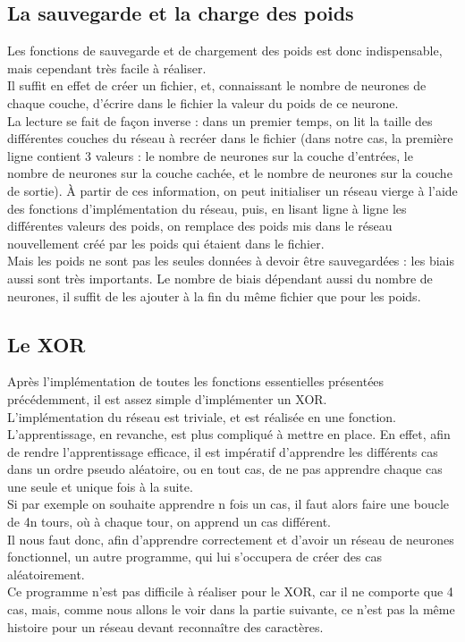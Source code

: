 \documentclass[14pt]{article}
\begin{document}
\subsection{La sauvegarde et la charge des poids}
Les fonctions de sauvegarde et de chargement des poids est donc indispensable, mais cependant très facile à réaliser.\\
Il suffit en effet de créer un fichier, et, connaissant le nombre de neurones de chaque couche, d'écrire dans le fichier la valeur du poids de ce neurone.\\
La lecture se fait de façon inverse : dans un premier temps, on lit la taille des différentes couches du réseau à recréer dans le fichier (dans notre cas, la première ligne contient 3 valeurs : le nombre de neurones sur la couche d'entrées, le nombre de neurones sur la couche cachée, et le nombre de neurones sur la couche de sortie). À partir de ces information, on peut initialiser un réseau vierge à l'aide des fonctions d'implémentation du réseau, puis, en lisant ligne à ligne les différentes valeurs des poids, on remplace des poids mis dans le réseau nouvellement créé par les poids qui étaient dans le fichier.\\
Mais les poids ne sont pas les seules données à devoir être sauvegardées : les biais aussi sont très importants. Le nombre de biais dépendant aussi du nombre de neurones, il suffit de les ajouter à la fin du même fichier que pour les poids.\\
\newpage
\subsection{Le XOR}
Après l'implémentation de toutes les fonctions essentielles présentées précédemment, il est assez simple d'implémenter un XOR.\\
L'implémentation du réseau est triviale, et est réalisée en une fonction. L'apprentissage, en revanche, est plus compliqué à mettre en place. En effet, afin de rendre l'apprentissage efficace, il est impératif d'apprendre les différents cas dans un ordre pseudo aléatoire, ou en tout cas, de ne pas apprendre chaque cas une seule et unique fois à la suite.\\
Si par exemple on souhaite apprendre n fois un cas, il faut alors faire une boucle de 4n tours, où à chaque tour, on apprend un cas différent.\\
Il nous faut donc, afin d'apprendre correctement et d'avoir un réseau de neurones fonctionnel, un autre programme, qui lui s'occupera de créer des cas aléatoirement.\\
Ce programme n'est pas difficile à réaliser pour le XOR, car il ne comporte que 4 cas, mais, comme nous allons le voir dans la partie suivante, ce n'est pas la même histoire pour un réseau devant reconnaître des caractères.\\
\newpage
\end{document}
